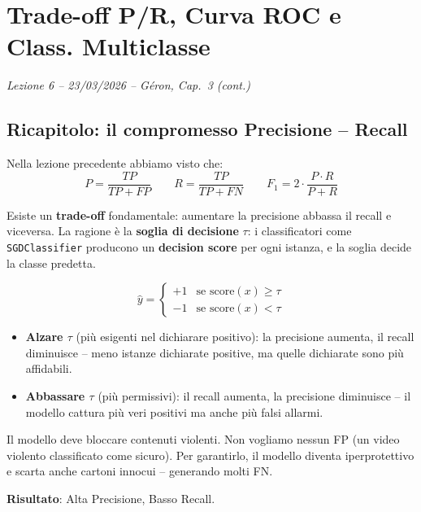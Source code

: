 \chapter{Trade-off P/R, Curva ROC e Class. Multiclasse}
\begin{flushright}\small\textit{Lezione 6 -- 23/03/2026 -- G\'eron, Cap.\ 3 (cont.)}\end{flushright}

\section{Ricapitolo: il compromesso Precisione -- Recall}

Nella lezione precedente abbiamo visto che:
\[
P = \frac{TP}{TP + FP} \qquad R = \frac{TP}{TP + FN} \qquad F_1 = 2 \cdot \frac{P \cdot R}{P + R}
\]

Esiste un \textbf{trade-off} fondamentale: aumentare la precisione abbassa il recall e viceversa. La ragione è la \textbf{soglia di decisione} $\tau$: i classificatori come \texttt{SGDClassifier} producono un \textbf{decision score} per ogni istanza, e la soglia decide la classe predetta.

\[
\hat{y} =
\begin{cases}
+1 & \text{se } \text{score}(x) \geq \tau \\
-1 & \text{se } \text{score}(x) < \tau
\end{cases}
\]

\begin{itemize}
    \item \textbf{Alzare $\tau$} (più esigenti nel dichiarare positivo): la precisione aumenta, il recall diminuisce -- meno istanze dichiarate positive, ma quelle dichiarate sono più affidabili.
    \item \textbf{Abbassare $\tau$} (più permissivi): il recall aumenta, la precisione diminuisce -- il modello cattura più veri positivi ma anche più falsi allarmi.
\end{itemize}

\begin{exbox}
Il modello deve bloccare contenuti violenti. Non vogliamo nessun FP (un video violento classificato come sicuro). Per garantirlo, il modello diventa iperprotettivo e scarta anche cartoni innocui -- generando molti FN.

\textbf{Risultato}: Alta Precisione, Basso Recall.
\end{exbox}

